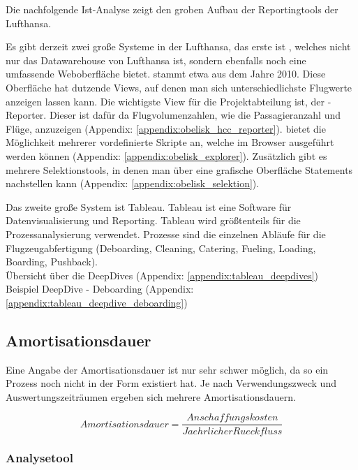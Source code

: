 		{

			\noindent
			Die nachfolgende Ist-Analyse zeigt den groben Aufbau der Reportingtools der Lufthansa.
		}
		{
			 \noindent
			 Es gibt derzeit zwei große Systeme in der Lufthansa, das erste ist , welches nicht nur das Datawarehouse von Lufthansa ist, sondern ebenfalls noch eine umfassende Weboberfläche bietet.  stammt etwa aus dem Jahre 2010.
			Diese Oberfläche hat dutzende Views, auf denen man sich unterschiedlichste Flugwerte anzeigen lassen kann. Die wichtigste View für die Projektabteilung ist, der -Reporter. Dieser ist dafür da Flugvolumenzahlen, wie die Passagieranzahl und Flüge, anzuzeigen (Appendix: \ref{appendix:obelisk_hcc_reporter}).
			 bietet die Möglichkeit mehrerer vordefinierte  Skripte an, welche im Browser ausgeführt werden können (Appendix: \ref{appendix:obelisk_explorer}).
			Zusätzlich gibt es mehrere Selektionstools, in denen man über eine grafische Oberfläche  Statements nachstellen kann (Appendix: \ref{appendix:obelisk_selektion}).
		}

		{
			\noindent
			Das zweite große System ist Tableau. Tableau ist eine Software für Datenvisualisierung und Reporting. Tableau wird größtenteils für die Prozessanalysierung verwendet. Prozesse sind die einzelnen Abläufe für die Flugzeugabfertigung (Deboarding, Cleaning, Catering, Fueling, Loading, Boarding, Pushback).\\

		}
		{
			\noindent
			Übersicht über die DeepDives (Appendix: \ref{appendix:tableau_deepdives})\\
			Beispiel DeepDive - Deboarding (Appendix: \ref{appendix:tableau_deepdive_deboarding})
		}

	\subsection{Amortisationsdauer}

	{
		\noindent
		Eine Angabe der Amortisationsdauer ist nur sehr schwer möglich, da so ein Prozess noch nicht in der Form existiert hat. Je nach Verwendungszweck und Auswertungszeiträumen ergeben sich mehrere Amortisationsdauern.

		\[ Amortisationsdauer = \frac{Anschaffungskosten}{Jaehrlicher Rueckfluss} \]

	}
	
	\subsubsection{Analysetool}


